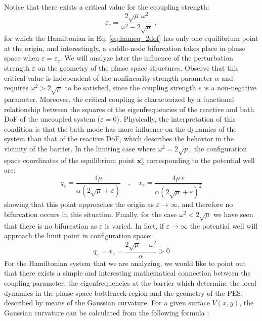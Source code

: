 \documentclass[8pt]{article}
\begin{document}
Notice that there exists a critical value for the ecoupling strength:
\begin{equation}
\varepsilon_c = \dfrac{2\sqrt{\mu} \, \omega^2}{\omega^2 - 2\sqrt{\mu}} \;,
\label{eq:crit_epsi}
\end{equation}
for which the Hamiltonian in Eq. \eqref{eq:hameq_2dof} has only one equilibrium point at the origin, and interestingly, a saddle-node bifurcation takes place in phase space when $\varepsilon = \varepsilon_c$. We will analyze later the influence of the perturbation strength $\varepsilon$ on the geometry of the phase space structures. Observe that this critical value is independent of the nonlinearity strength parameter $\alpha$ and requires $\omega^2 > 2\sqrt{\mu}$ to be satisfied, since the coupling strength $\varepsilon$ is a non-negative parameter. Moreover, the critical coupling is characterized by a functional relationship between the squares of the eigenfrequencies of the reactive and bath DoF of the uncoupled system ($\varepsilon = 0$). Physically, the interpretation of this condition is that the bath mode has more influence on the dynamics of the system than that of the reactive DoF, which describes the behavior in the vicinity of the barrier. In the limiting case where $\omega^2 = 2\sqrt{\mu}$, the configuration space coordinates of the equilibrium point $\mathbf{x}_2^e$ corresponding to the potential well are:
\begin{equation}
q_e = \frac{4\mu}{\alpha(2\sqrt{\mu} + \varepsilon)} \quad,\quad x_e =  \frac{4\mu \, \varepsilon}{\alpha(2\sqrt{\mu} + \varepsilon)^2}
\end{equation}
showing that this point approaches the origin as $\varepsilon \to \infty$, and therefore no bifurcation occurs in this situation. Finally, for the case $\omega^2 < 2\sqrt{\mu}$ we have seen that there is no bifurcation as $\varepsilon$ is varied. In fact, if  $\varepsilon \to \infty$ the potential well will approach the limit point in configuration space:
\begin{equation}
q_e = x_e = \frac{2\sqrt{\mu} - \omega^2}{\alpha} > 0    
\end{equation}
For the Hamiltonian system that we are analyzing, we would like to point out that there exists a simple and interesting mathematical connection between the coupling parameter, the eigenfrequencies at the barrier which determine the local dynamics in the phase space bottleneck region and the geometry of the PES, described by means of the Gaussian curvature. For a given surface $V(x,y)$, the Gaussian curvature can be calculated from the following formula \cite{spivak}:
\end{document}
